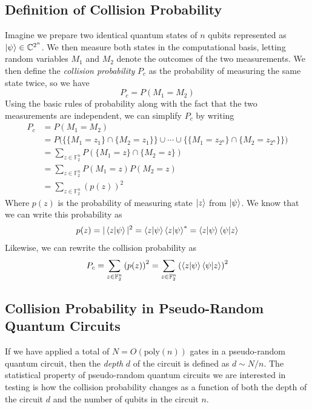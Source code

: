 \documentclass[11pt]{article}
\theoremstyle{definition}
\theoremstyle{plain}
\begin{document}
\subsection{Definition of Collision Probability}
Imagine we prepare two identical quantum states of $n$ qubits represented as $\ket{\psi} \in \mathbb{C}^{2^n}$. We then measure both states in the computational basis, letting random variables $M_1$ and $M_2$ denote the outcomes of the two measurements. We then define the \emph{collision probability} $P_c$ as the probability of measuring the same state twice, so we have
\begin{equation}
P_c = P(M_1 = M_2) 
\end{equation}
Using the basic rules of probability along with the fact that the two measurements are independent, we can simplify $P_c$ by writing
\begin{align}
  P_c &= P(M_1 = M_2) \\
      &= P \bigl( \bigl\{ \{M_1 = z_1\} \cap \{M_2 = z_1\} \bigr\} \cup \cdots \cup 
        \bigl\{ \{M_1 = z_{2^n}\} \cap \{M_2 = z_{2^n}\} \bigr\} \bigr) \\
      &= \sum\limits_{z \in \mathbb{F}_2^n} P(\{M_1 = z\} \cap \{M_2 = z\}) \\
      &= \sum\limits_{z \in \mathbb{F}_2^n} P(M_1 = z) P(M_2 = z) \\
      &= \sum\limits_{z \in \mathbb{F}_2^n} {(p(z))}^2        
\end{align}
Where $p(z)$ is the probability of measuring state $\ket{z}$ from $\ket{\psi}$. We know that we can write this probability as
\begin{equation}
  p(z) = |\braket{z | \psi}|^2 = \braket{z | \psi} \braket{z | \psi}^*
  = \braket{z | \psi} \braket{\psi | z} 
\end{equation}
Likewise, we can rewrite the collision probability as 
\begin{equation}\label{collision_probability}
  P_c = \sum\limits_{z \in \mathbb{F}_2^n} {(p(z))}^2
  = \sum\limits_{z \in \mathbb{F}_2^n} {\left( \braket{z | \psi} \braket{\psi | z} \right)}^2
\end{equation}

\subsection{Collision Probability in Pseudo-Random Quantum Circuits}\label{cp_conjecture}
If we have applied a total of $N = O(\text{poly}(n))$ gates in a pseudo-random quantum circuit, then the \emph{depth} $d$ of the circuit is defined as $d \sim N / n$. The statistical property of pseudo-random quantum circuits we are interested in testing is how the collision probability changes as a function of both the depth of the circuit $d$ and the number of qubits in the circuit $n$. 
\end{document}
